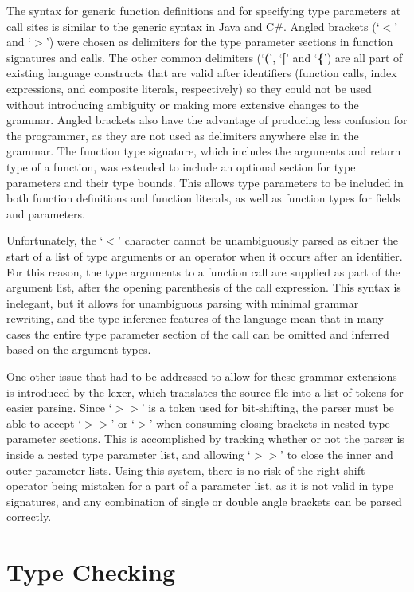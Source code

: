 \documentclass[letterpaper,11pt]{article}
\begin{document}
The syntax for generic function definitions and for specifying type parameters at call sites is similar to the generic syntax in Java and C\#. Angled brackets (`\textbf{$<$}' and `\textbf{$>$}') were chosen as delimiters for the type parameter sections in function signatures and calls. The other common delimiters (`\textbf{(}', `\textbf{[}' and `\textbf{\{}') are all part of existing language constructs that are valid after identifiers (function calls, index expressions, and composite literals, respectively) so they could not be used without introducing ambiguity or making more extensive changes to the grammar. Angled brackets also have the advantage of producing less confusion for the programmer, as they are not used as delimiters anywhere else in the grammar. The function type signature, which includes the arguments and return type of a function, was extended to include an optional section for type parameters and their type bounds. This allows type parameters to be included in both function definitions and function literals, as well as function types for fields and parameters.

Unfortunately, the `\textbf{$<$}' character cannot be unambiguously parsed as either the start of a list of type arguments or an operator when it occurs after an identifier. For this reason, the type arguments to a function call are supplied as part of the argument list, after the opening parenthesis of the call expression. This syntax is inelegant, but it allows for unambiguous parsing with minimal grammar rewriting, and the type inference features of the language mean that in many cases the entire type parameter section of the call can be omitted and inferred based on the argument types.

One other issue that had to be addressed to allow for these grammar extensions is introduced by the lexer, which translates the source file into a list of tokens for easier parsing. Since `\textbf{$>>$}' is a token used for bit-shifting, the parser must be able to accept `\textbf{$>>$}' or  `\textbf{$>$}' when consuming closing brackets in nested type parameter sections. This is accomplished by tracking whether or not the parser is inside a nested type parameter list, and allowing  `\textbf{$>>$}' to close the inner and outer parameter lists. Using this system, there is no risk of the right shift operator being mistaken for a part of a parameter list, as it is not valid in type signatures, and any combination of single or double angle brackets can be parsed correctly.

\section{Type Checking} \label{typechecking}
\end{document}
